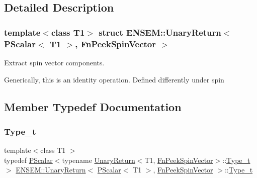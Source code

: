 \subsection{Detailed Description}
\subsubsection*{template$<$class T1$>$\newline
struct E\+N\+S\+E\+M\+::\+Unary\+Return$<$ P\+Scalar$<$ T1 $>$, Fn\+Peek\+Spin\+Vector $>$}

Extract spin vector components. 

Generically, this is an identity operation. Defined differently under spin 

\subsection{Member Typedef Documentation}
\mbox{\label{structENSEM_1_1UnaryReturn_3_01PScalar_3_01T1_01_4_00_01FnPeekSpinVector_01_4_ac623af45f4638d6db8fefb084c447ef0}} 
\subsubsection{\texorpdfstring{Type\_t}{Type\_t}\hspace{0.1cm}{\footnotesize\ttfamily [1/3]}}
{\footnotesize\ttfamily template$<$class T1 $>$ \\
typedef \mbox{\hyperlink{classENSEM_1_1PScalar}{P\+Scalar}}$<$typename \mbox{\hyperlink{structENSEM_1_1UnaryReturn}{Unary\+Return}}$<$T1, \mbox{\hyperlink{structENSEM_1_1FnPeekSpinVector}{Fn\+Peek\+Spin\+Vector}}$>$\+::\mbox{\hyperlink{structENSEM_1_1UnaryReturn_3_01PScalar_3_01T1_01_4_00_01FnPeekSpinVector_01_4_ac623af45f4638d6db8fefb084c447ef0}{Type\+\_\+t}}$>$ \mbox{\hyperlink{structENSEM_1_1UnaryReturn}{E\+N\+S\+E\+M\+::\+Unary\+Return}}$<$ \mbox{\hyperlink{classENSEM_1_1PScalar}{P\+Scalar}}$<$ T1 $>$, \mbox{\hyperlink{structENSEM_1_1FnPeekSpinVector}{Fn\+Peek\+Spin\+Vector}} $>$\+::\mbox{\hyperlink{structENSEM_1_1UnaryReturn_3_01PScalar_3_01T1_01_4_00_01FnPeekSpinVector_01_4_ac623af45f4638d6db8fefb084c447ef0}{Type\+\_\+t}}}

